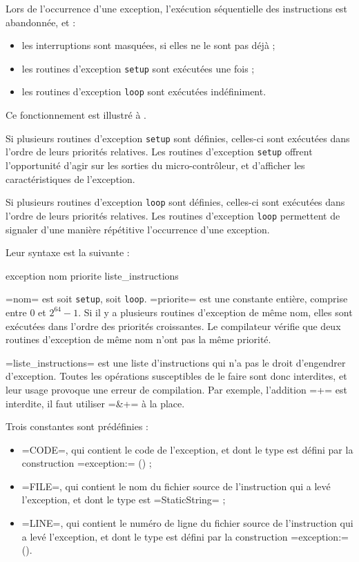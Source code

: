 Lors de l'occurrence d'une exception, l'exécution séquentielle des instructions est abandonnée, et :
\begin{itemize}
  \item les interruptions sont masquées, si elles ne le sont pas déjà ;
  \item les routines d'exception \texttt{setup} sont exécutées une fois ;
  \item les routines d'exception \texttt{loop} sont exécutées indéfiniment.
\end{itemize}
Ce fonctionnement est illustré à .

Si plusieurs routines d'exception \texttt{setup} sont définies, celles-ci sont exécutées dans l'ordre de leurs priorités relatives. Les routines d'exception \texttt{setup} offrent l'opportunité d'agir sur les sorties du micro-contrôleur, et d'afficher les caractéristiques de l'exception.

Si plusieurs routines d'exception \texttt{loop} sont définies, celles-ci sont exécutées dans l'ordre de leurs priorités relatives. Les routines d'exception \texttt{loop} permettent de signaler d'une manière répétitive l'occurrence d'une exception.


Leur syntaxe est la suivante :
\begin{PLM}
exception nom priorite {
  liste_instructions
}
\end{PLM}

\plm=nom= est soit \texttt{setup}, soit \texttt{loop}. \plm=priorite= est une constante entière, comprise entre $0$ et $2^{64}-1$. Si il y a plusieurs routines d'exception de même nom, elles sont exécutées dans l'ordre des priorités croissantes. Le compilateur vérifie que deux routines d'exception de même nom n'ont pas la même priorité.

\plm=liste_instructions= est une liste d'instructions qui n'a pas le droit d'engendrer d'exception. Toutes les opérations susceptibles de le faire sont donc interdites, et leur usage provoque une erreur de compilation. Par exemple, l'addition \plm=+= est interdite, il faut utiliser \plm=&+= à la place.

Trois constantes sont prédéfinies :
\begin{itemize}
  \item \plm=CODE=, qui contient le code de l'exception, et dont le type est défini par la construction \plm=exception:= () ;
  \item \plm=FILE=, qui contient le nom du fichier source de l'instruction qui a levé l'exception, et dont le type est \plm=StaticString= ;
  \item \plm=LINE=, qui contient le numéro de ligne du fichier source de l'instruction qui a levé l'exception, et dont le type est défini par la construction \plm=exception:= ().
\end{itemize}

